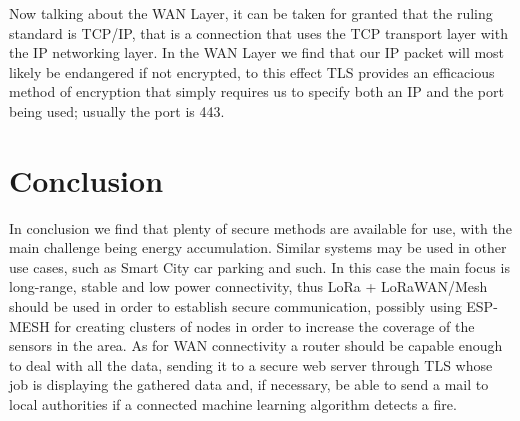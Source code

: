 \documentclass[11pt]{article}
\begin{document}
Now talking about the WAN Layer, it can be taken for granted that the ruling standard is TCP/IP, that is a connection that uses the TCP transport layer with the IP networking layer. In the WAN Layer we find that our IP packet will most likely be endangered if not encrypted, to this effect TLS provides an efficacious method of encryption that simply requires us to specify both an IP and the port being used; usually the port is 443. \par \vspace{0.5 cm}

\newpage

\section{Conclusion}

In conclusion we find that plenty of secure methods are available for use, with the main challenge being energy accumulation. Similar systems may be used in other use cases, such as Smart City car parking and such. In this case the main focus is long-range, stable and low power connectivity, thus LoRa + LoRaWAN/Mesh should be used in order to establish secure communication, possibly using ESP-MESH for creating clusters of nodes in order to increase the coverage of the sensors in the area. As for WAN connectivity a router should be capable enough to deal with all the data, sending it to a secure web server through TLS whose job is displaying the gathered data and, if necessary, be able to send a mail to local authorities if a connected machine learning algorithm detects a fire. 
\end{document}
